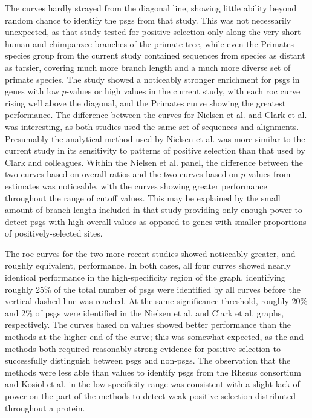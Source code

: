 The \citet{Clark2003} curves hardly strayed from the diagonal line,
showing little ability beyond random chance to identify the \acp{psg}
from that study. This was not necessarily unexpected, as that study
tested for positive selection only along the very short human and
chimpanzee branches of the primate tree, while even the Primates
species group from the current study contained sequences from species
as distant as tarsier, covering much more branch length and a much
more diverse set of primate species. The \citet{Nielsen2005} study
showed a noticeably stronger enrichment for \acp{psg} in genes with
low $p$-values or high \dnds values in the current study, with each
\ac{roc} curve rising well above the diagonal, and the Primates \dnds
curve showing the greatest performance. The difference between the
curves for Nielsen et al. and Clark et al. was interesting, as both
studies used the same set of sequences and alignments. Presumably the
analytical method used by Nielsen et al. was more similar to the
current study in its sensitivity to patterns of positive selection
than that used by Clark and colleagues. Within the Nielsen et
al. panel, the difference between the two curves based on overall
\dnds ratios and the two curves based on $p$-values from \sw estimates
was noticeable, with the \dnds curves showing greater performance
throughout the range of cutoff values. This may be explained by the
small amount of branch length included in that study providing only
enough power to detect \acp{psg} with high overall \dnds values as
opposed to genes with smaller proportions of positively-selected
sites.

The \ac{roc} curves for the two more recent studies showed noticeably
greater, and roughly equivalent, performance. In both cases, all four
curves showed nearly identical performance in the high-specificity
region of the graph, identifying roughly 25\% of the total number of
\acp{psg} were identified by all curves before the vertical dashed
line was reached. At the same significance threshold, roughly 20\% and
2\% of \acp{psg} were identified in the Nielsen et al. and Clark et
al. graphs, respectively. The curves based on \dnds values showed
better performance than the \sw methods at the higher end of the
curve; this was somewhat expected, as the \psgeone and \psghoch
methods both required reasonably strong \sw evidence for positive
selection to successfully distinguish between \acp{psg} and
non-\acp{psg}. The observation that the \sw methods were less able
than \dnds values to identify \acp{psg} from the Rhesus consortium and
Kosiol et al. in the low-specificity range was consistent with a
slight lack of power on the part of the \sw methods to detect weak
positive selection distributed throughout a protein.

